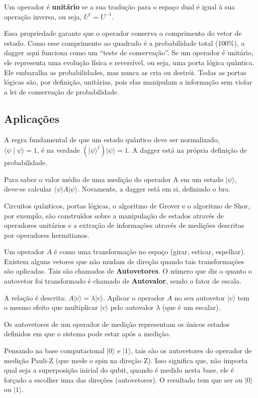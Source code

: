 \documentclass[12pt, a4paper]{article}
\newcommand{\ket}[1]{\lvert #1 \rangle}
\newcommand{\bra}[1]{\langle #1 \rvert}
\newcommand{\braket}[2]{\langle #1 \mid #2 \rangle}
\begin{document}
Um operador é \textbf{unitário} se a sua tradução para o espaço dual é igual à sua operação inversa, ou seja, $U^\dagger = U^{-1}$.

Essa propriedade garante que o operador conserva o comprimento do vetor de estado. Como esse comprimento ao quadrado é a probabilidade total (100\%), a dagger aqui funciona como um ``teste de conservação''. Se um operador é unitário, ele representa uma evolução física e reversível, ou seja, uma porta lógica quântica. Ele embaralha as probabilidades, mas nunca as cria ou destrói. Todas as portas lógicas são, por definição, unitárias, pois elas manipulam a informação sem violar a lei de conservação de probabilidade.

\subsection{Aplicações}

A regra fundamental de que um estado quântico deve ser normalizado, $\braket{\psi}{\psi} = 1$, é  na verdade $(\ket{\psi}^\dagger)\ket{\psi} = 1$. A dagger está na própria definição de probabilidade.

Para saber o valor médio de uma medição do operador A em um estado $\ket{\psi}$, deve-se calcular $\bra{\psi}A\ket{\psi}$. Novamente, a dagger está em si, definindo o bra.

Circuitos quânticos, portas lógicas, o algoritmo de Grover e o algoritmo de Shor, por exemplo, são construídos sobre a manipulação de estados através de operadores unitários e a extração de informações através de medições descritas por operadores hermitianos.

Um operador $A$ é como uma transformação no espaço (girar, esticar, espelhar). Existem alguns vetores que não mudam de direção quando tais transformações são aplicadas. Tais são chamados de \textbf{Autovetores}. O número que diz o quanto o autovetor foi transformado é chamado de \textbf{Autovalor}, sendo o fator de escala.

A relação é descrita: $A\ket{v} = \lambda\ket{v}$. Aplicar o operador $A$ no seu autovetor $\ket{v}$ tem o mesmo efeito que multiplicar $\ket{v}$ pelo autovalor $\lambda$ (que é um escalar).

Os autovetores de um operador de medição representam os únicos estados definidos em que o sistema pode estar após a medição.

Pensando na base computacional $\ket{0}$ e $\ket{1}$, tais são os autovetores do operador de medição Pauli-Z (que mede o spin na direção Z). Isso significa que, não importa qual seja a superposição inicial do qubit, quando é medido nesta base, ele é forçado a escolher uma das direções (autovetores). O resultado tem que ser ou $\ket{0}$
ou $\ket{1}$.
\end{document}
